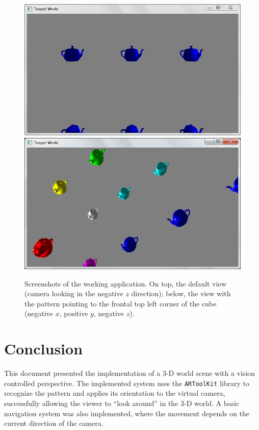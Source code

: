 \documentclass{acmtog}
\begin{document}
\begin{figure}[!htp]
	\begin{center}
		\includegraphics[width=\columnwidth]{images/screenshot/default.png}
		\includegraphics[width=\columnwidth]{images/screenshot/ftl.png}
	\end{center}
	\caption[Application screenshots]{Screenshots of the working application. On top, the default view (camera looking in the negative $z$ direction); below, the view with the pattern pointing to the frontal top left corner of the cube (negative $x$, positive $y$, negative $z$).}
	\label{fig:screenshots}
\end{figure}

\section{Conclusion}
This document presented the implementation of a 3-D world scene with a vision controlled perspective. The implemented system uses the \texttt{ARToolKit} library to recognize the pattern and applies its orientation to the virtual camera, successfully allowing the viewer to ``look around'' in the 3-D world. A basic navigation system was also implemented, where the movement depends on the current direction of the camera.
\end{document}
